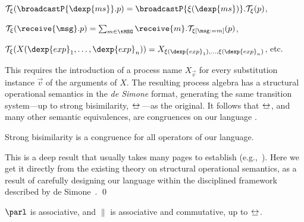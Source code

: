 \documentclass[envcountsame,envcountsect,orivec,runningheads]{llncs}
\newcommand{\bis}{\ensuremath{\mathop{\,\raisebox{.3ex}{$\underline{\makebox[.7em]{$\leftrightarrow$}}$}\xspace}}}
\begin{document}
$\mathcal{T}_\xi(\broadcastP{\dexp{ms}}.p)=
 \broadcastP{\xi(\dexp{ms})}.\mathcal{T}_\xi(p)$,

$\mathcal{T}_\xi(\receive{\msg}.p)=
 \sum_{m\in\tMSG}\receive{m}.\mathcal{T}_{\xi[\msg:=m]}(p)$,

$\mathcal{T}_\xi(X(\dexp{exp}_1,\ldots,\dexp{exp}_n))=
 X_{\xi(\dexp{exp}_1),\ldots,\xi(\dexp{exp}_n)}$, etc.

\noindent
This requires the introduction of a process name $X_{\vec{v}}$
for every substitution instance $\vec{v}$ of the arguments of $X$.
The resulting process algebra has a structural operational semantics in the
\emph{de Simone} format, generating the same transition system---up to strong
bisimilarity, $\bis$ ---as the original. It follows that $\bis\,$, and many other
semantic equivalences, are congruences on our language \cite{dS85}.

\begin{theorem}\label{thm:1}
Strong bisimilarity is a congruence for all operators of our language.
\end{theorem}

\noindent
This is a deep result that usually takes many pages to establish (e.g.,~\cite{SRS10}).
Here we get it directly from the existing theory on structural
operational semantics, as a result of carefully designing our
language within the disciplined framework described by de Simone~\cite{dS85}.
\qed

\begin{theorem}\label{thm:2}
$\parl$ is associative, and $\|$ is associative and commutative, up to $\bis$\,.
\end{theorem}
\end{document}
